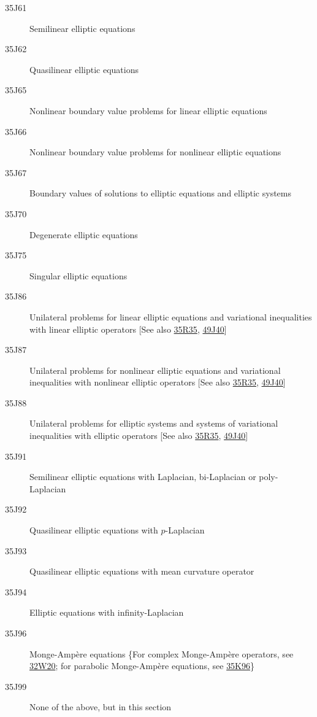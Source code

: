 \begin{description}
\item [35J61]\label{35J61} Semilinear elliptic  equations
\item [35J62]\label{35J62} Quasilinear elliptic  equations
\item [35J65]\label{35J65} Nonlinear boundary value problems for linear elliptic  equations
\item [35J66]\label{35J66} Nonlinear boundary value problems for nonlinear elliptic  equations
\item [35J67]\label{35J67} Boundary values of solutions to elliptic  equations and  elliptic systems
\item [35J70]\label{35J70} Degenerate elliptic  equations
\item [35J75]\label{35J75} Singular elliptic  equations
\item [35J86]\label{35J86} Unilateral problems for linear elliptic  equations and variational inequalities with linear elliptic  operators [See also \hyperref[35R35]{35R35}, \hyperref[49J40]{49J40}]
\item [35J87]\label{35J87} Unilateral problems for nonlinear elliptic  equations and variational inequalities with nonlinear elliptic  operators [See also \hyperref[35R35]{35R35}, \hyperref[49J40]{49J40}]
\item [35J88]\label{35J88} Unilateral problems for elliptic systems and  systems of variational inequalities with elliptic  operators [See also \hyperref[35R35]{35R35}, \hyperref[49J40]{49J40}]
\item [35J91]\label{35J91} Semilinear elliptic  equations with Laplacian, bi-Laplacian or poly-Laplacian
\item [35J92]\label{35J92} Quasilinear elliptic  equations with $p$-Laplacian
\item [35J93]\label{35J93} Quasilinear elliptic  equations with mean curvature operator
\item [35J94]\label{35J94} Elliptic  equations with infinity-Laplacian
\item [35J96]\label{35J96} Monge-Amp\`{e}re equations \{For complex Monge-Amp\`{e}re operators, see \hyperref[32W20]{32W20}; for parabolic Monge-Amp\`{e}re equations, see \hyperref[35K96]{35K96}\}
\item [35J99]\label{35J99} None of the above, but in this section
\end{description}
